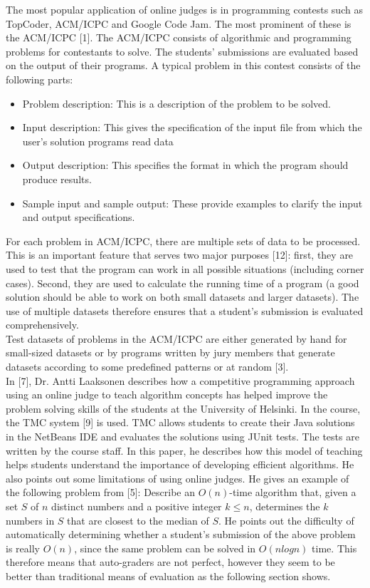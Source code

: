 \documentclass[12pt]{article}
\begin{document}
		The most popular application of online judges is in programming contests such as TopCoder,
	ACM/ICPC and Google Code Jam. The most prominent of these is the ACM/ICPC [1]. The
	ACM/ICPC consists of algorithmic and programming problems for contestants to solve. The
	students’ submissions are evaluated based on the output of their programs. A typical problem in
	this contest consists of the following parts:
		\begin{itemize}
			\item Problem description: This is a description of the problem to be solved.
			\item  Input description: This gives the specification of the input file from which the user’s
				solution programs read data
			\item Output description: This specifies the format in which the program should produce
				results.
			\item Sample input and sample output: These provide examples to clarify the input and output
				specifications.
		\end{itemize}

		For each problem in ACM/ICPC, there are multiple sets of data to be processed. This is an
	important feature that serves two major purposes [12]: first, they are used to test that the program
	can work in all possible situations (including corner cases). Second, they are used to calculate the
	running time of a program (a good solution should be able to work on both small datasets and
	larger datasets). The use of multiple datasets therefore ensures that a student’s submission is
	evaluated comprehensively. \\
	Test datasets of problems in the ACM/ICPC are either generated by hand for small-sized datasets
	or by programs written by jury members that generate datasets according to some predefined
	patterns or at random [3].\\
	In [7], Dr. Antti Laaksonen describes how a competitive programming approach using an online
	judge to teach algorithm concepts has helped improve the problem solving skills of the students at the University of Helsinki. In 		the course, the TMC system [9] is used. TMC allows students to
	create their Java solutions in the NetBeans IDE and evaluates the solutions using JUnit tests. The
	tests are written by the course staff. In this paper, he describes how this model of teaching helps
	students understand the importance of developing efficient algorithms. He also points out some
	limitations of using online judges. He gives an example of the following problem from [5]:
	Describe an $O(n)$-time algorithm that, given a set $S$ of $𝑛$ distinct numbers and a positive
	integer $k ≤ n$, determines the $k$ numbers in $S$ that are closest to the median of $S$.
	He points out the difficulty of automatically determining whether a student’s submission of the
	above problem is really $O(n)$, since the same problem can be solved in $O(n log n)$ time. This
	therefore means that auto-graders are not perfect, however they seem to be better than traditional
	means of evaluation as the following section shows.
\end{document}
